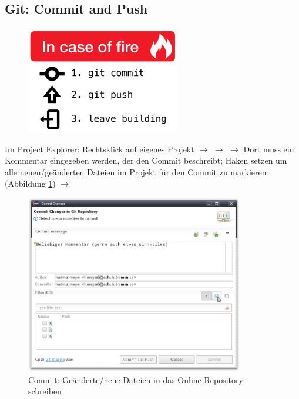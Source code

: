 \subsection{Git: Commit and Push}

\begin{figure}[h]
  \centering
   \includegraphics[width=0.60\textwidth]{./inf/SEKII/01_Vorbereitung/in-case-of-fire-1-git-commit-2-git-push-3-leave-building2.png}
\end{figure}

Im Project Explorer: Rechtsklick auf eigenes Projekt $\rightarrow$ 
$\rightarrow$  $\rightarrow$ Dort muss ein Kommentar
eingegeben werden, der den Commit beschreibt; Haken setzen um alle
neuen/geänderten Dateien im Projekt für den Commit zu markieren (Abbildung
\ref{fig:git-commit}) $\rightarrow$ 

\begin{figure}[h]
  \centering
   \includegraphics[width=0.85\textwidth]{./inf/SEKII/01_Vorbereitung/Git-Commit.png}
   \caption{Commit: Geänderte/neue Dateien in das Online-Repository schreiben}
   \label{fig:git-commit}
\end{figure}


